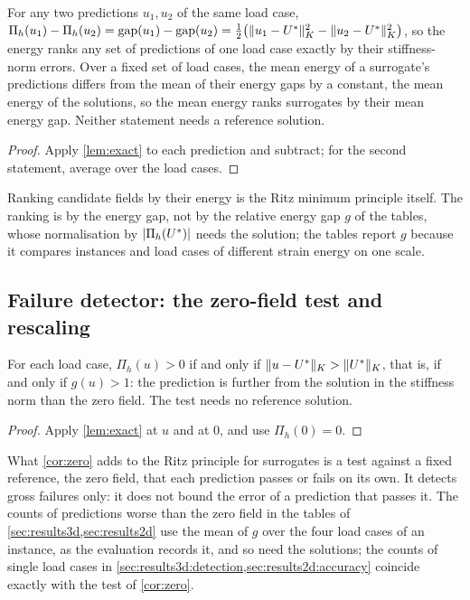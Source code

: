 \begin{corollary}\label{cor:rank}
For any two predictions $u_1,u_2$ of the same load case,
$\Pi_h(u_1)-\Pi_h(u_2)=\operatorname{gap}(u_1)-\operatorname{gap}(u_2)
=\tfrac12\bigl(\lVert u_1-U^{\ast}\rVert_K^2-\lVert u_2-U^{\ast}\rVert_K^2\bigr)$, so the energy ranks
any set of predictions of one load case exactly by their stiffness-norm errors. Over a
fixed set of load cases, the mean energy of a surrogate's predictions differs from the mean
of their energy gaps by a constant, the mean energy of the solutions, so the mean energy
ranks surrogates by their mean energy gap. Neither statement needs a reference solution.
\end{corollary}

\begin{proof}
Apply \cref{lem:exact} to each prediction and subtract; for the second statement, average
over the load cases.
\end{proof}

Ranking candidate fields by their energy is the Ritz minimum principle itself. The ranking
is by the energy gap, not by the relative energy gap $g$ of the tables, whose normalisation
by $\lvert\Pi_h(U^{\ast})\rvert$ needs the solution; the tables report $g$ because it compares
instances and load cases of different strain energy on one scale.

\subsection{Failure detector: the zero-field test and rescaling}\label{sec:theory:detector}

\begin{corollary}\label{cor:zero}
For each load case, $\Pi_h(u)>0$ if and only if $\lVert u-U^{\ast}\rVert_K>\lVert U^{\ast}\rVert_K$, that
is, if and only if $g(u)>1$: the prediction is further from the solution in the stiffness
norm than the zero field. The test needs no reference solution.
\end{corollary}

\begin{proof}
Apply \cref{lem:exact} at $u$ and at $0$, and use $\Pi_h(0)=0$.
\end{proof}

What \cref{cor:zero} adds to the Ritz principle for surrogates is a test against a fixed
reference, the zero field, that each prediction passes or fails on its own. It detects
gross failures only: it does not bound the error of a prediction that passes it. The counts
of predictions worse than the zero field in the tables of
\cref{sec:results3d,sec:results2d} use the mean of $g$ over the four load cases of an
instance, as the evaluation records it, and so need the solutions; the counts of single
load cases in \cref{sec:results3d:detection,sec:results2d:accuracy} coincide exactly with
the test of \cref{cor:zero}.

